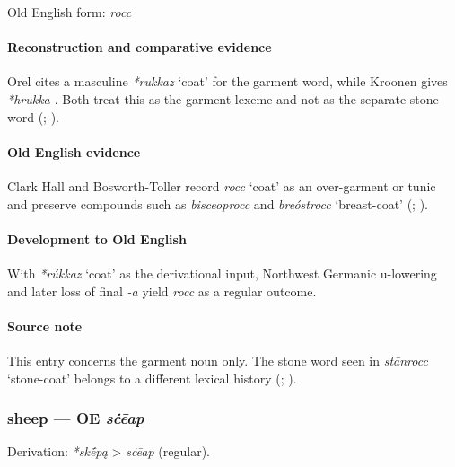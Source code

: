 \documentclass[
  british,
  a4paper,
]{article}
\providecommand{\Recon}[1]{\emph{*#1}}
\begin{document}
Old English form: \emph{rocc}

\paragraph{Reconstruction and comparative
evidence}\label{reconstruction-and-comparative-evidence-46}

Orel cites a masculine \Recon{rukkaz} `coat' for the garment word, while
Kroonen gives \emph{*hrukka-}. Both treat this as the garment lexeme and
not as the separate stone word (;
).

\paragraph{Old English evidence}\label{old-english-evidence-46}

Clark Hall and Bosworth-Toller record \emph{rocc} `coat' as an
over-garment or tunic and preserve compounds such as \emph{bisceoprocc}
and \emph{breóstrocc} `breast-coat' (; ).

\paragraph{Development to Old
English}\label{development-to-old-english-46}

With \Recon{rúkkaz} `coat' as the derivational input, Northwest Germanic
u-lowering and later loss of final \emph{-a} yield \emph{rocc} as a
regular outcome.

\paragraph{Source note}\label{source-note-3}

This entry concerns the garment noun only. The stone word seen in
\emph{stānrocc} `stone-coat' belongs to a different lexical history
(;
).

\subsubsection{\texorpdfstring{sheep --- OE
\emph{sċēap}}{sheep --- OE sċēap}}\label{sheep-oe-sux10bux113ap}

Derivation: \emph{*skḗpą} \textgreater{} \emph{sċēap} (regular).
\end{document}
